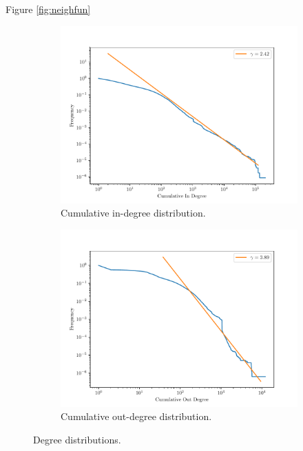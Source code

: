 \documentclass[9pt,a4paper,twocolumn]{article}
\begin{document}
Figure \ref{fig:neighfun} 


\begin{figure}[h]
	\centering
	\begin{subfigure}{.45\textwidth}
		\centering
		\includegraphics[width=\linewidth]{wikipedia_pt_in.pdf}
		\caption{Cumulative in-degree distribution.}
		\label{fig:inddist}
	\end{subfigure}
	\begin{subfigure}{.45\textwidth}
		\centering
		\includegraphics[width=\linewidth]{wikipedia_pt_out.pdf}
		\caption{Cumulative out-degree distribution.}
		\label{fig:outddist}
	\end{subfigure}
	\caption{Degree distributions.}
\end{figure}
\end{document}

